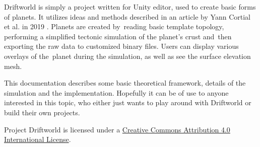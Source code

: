 Driftworld is simply a project written for Unity editor, used to create basic forms of planets. It utilizes ideas and methods described in an article by Yann Cortial et al. in 2019 \cite{cortial}. Planets are created by~reading basic template topology, performing a simplified tectonic simulation of the planet's crust and~then exporting the raw data to customized binary files. Users can display various overlays of the~planet during the simulation, as well as see the surface elevation mesh.\par
This documentation describes some basic theoretical framework, details of the simulation and the implementation. Hopefully it can be of use to anyone interested in this topic, who either just wants to play around with Driftworld or build their own projects.\par
Project Driftworld is licensed under a \href{https://creativecommons.org/licenses/by/4.0/}{Creative Commons Attribution 4.0 International License}.